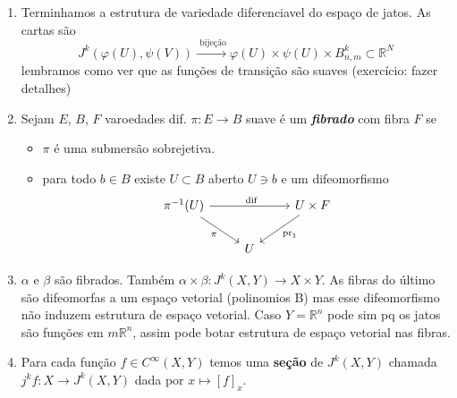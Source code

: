 \begin{enumerate}
\item Terminhamos a estrutura de variedade diferenciavel do espaço de jatos. As cartas são
	\[J^k(\varphi(U),\psi(V)) \xrightarrow{\text{ bijeção} }\varphi(U) \times \psi(U) \times B^k_{n,m}\subset \mathbb{R}^N\]
	lembramos como ver que as funções de transição são suaves {\color{2}(exercício: fazer detalhes)}
\item
	\begin{defn}\leavevmode
	Sejam \(E\), \(B\), \(F\) varoedades dif. \(\pi: E \to B\) suave é um \textit{\textbf{fibrado}} com fibra \(F\) se
	\begin{itemize}
	\item \(\pi\) é uma submersão sobrejetiva.
	\item  para todo \(b \in B\) existe \(U \subset B \) aberto \( U \ni b\) e um difeomorfismo
		\[\begin{tikzcd}
		\pi^{-1}(U)\arrow[rr,"\text{ dif} "]\arrow[dr,"\pi",swap]&&U \times F\arrow[dl,"\operatorname{pr}_1"]\\
		&U
		\end{tikzcd}\]
	\end{itemize}
	\end{defn}

\item  \(\alpha \) e \(\beta\) são fibrados. Também \(\alpha \times \beta: J^k(X,Y)\to X \times Y\). As fibras do último são difeomorfas a um espaço vetorial (polinomios B) mas esse difeomorfismo não induzem estrutura de espaço vetorial. Caso \(Y=\mathbb{R}^n\) pode sim pq os jatos são funções em \(m\mathbb{R}^n\), assim pode botar estrutura de espaço vetorial nas fibras.
\item Para cada função  \(f \in C^\infty(X,Y)\) temos uma \textbf{seção} de \(J^k(X,Y)\) chamada \(j^k f:X \to J^k(X,Y)\) dada por \(x \mapsto  [f]_x\).


\end{enumerate}
